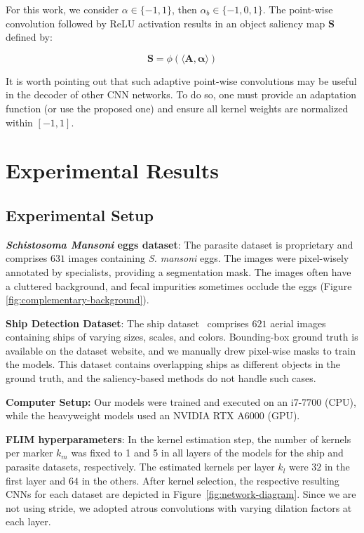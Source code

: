 \documentclass[10pt,twocolumn,twoside]{IEEEtran}
\begin{document}
    For this work, we consider $\alpha\in \{-1,1\}$, then $\alpha_b\in \{-1,0,1\}$. The point-wise convolution followed by ReLU activation results in an object saliency map $\mathbf{S}$ defined by:

    \begin{equation}
        \mathbf{S} = \phi(\langle\mathbf{A}, \boldsymbol{\alpha}\rangle)
    \end{equation}
    
    It is worth pointing out that such adaptive point-wise convolutions may be useful in the decoder of other CNN networks. To do so, one must provide an adaptation function (or use the proposed one) and ensure all kernel weights are normalized within $[-1,1]$.
    
\section{Experimental Results}\label{sec:results}
\subsection{Experimental Setup}\label{subsec:params}

    \textbf{\textit{Schistosoma Mansoni} eggs dataset}: The parasite dataset is proprietary and comprises $631$ images containing \textit{S. mansoni} eggs. The images were pixel-wisely annotated by specialists, providing a segmentation mask. The images often have a cluttered background, and fecal impurities sometimes occlude the eggs (Figure \ref{fig:complementary-background}). 
    
    \textbf{Ship Detection Dataset}: The ship dataset~\cite{ships2018} comprises $621$ aerial images containing ships of varying sizes, scales, and colors. Bounding-box ground truth is available on the dataset website, and we manually drew pixel-wise masks to train the models. This dataset contains overlapping ships as different objects in the ground truth, and the saliency-based methods do not handle such cases.

    \textbf{Computer Setup:} Our models were trained and executed on an i7-7700 (CPU), while the heavyweight models used an NVIDIA RTX A6000 (GPU).

    \textbf{FLIM hyperparameters}: In the kernel estimation step, the number of kernels per marker $k_m$ was fixed to 1 and 5 in all layers of the models for the ship and parasite datasets, respectively. The estimated kernels per layer $k_l$ were $32$ in the first layer and $64$ in the others. After kernel selection, the respective resulting CNNs for each dataset are depicted in Figure~\ref{fig:network-diagram}. Since we are not using stride, we adopted atrous convolutions with varying dilation factors at each layer.
    
\end{document}
